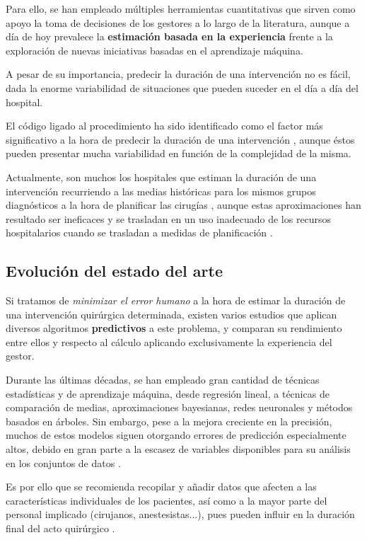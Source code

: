 Para ello, se han empleado múltiples herramientas cuantitativas que sirven como apoyo la toma de decisiones de los gestores a lo largo de la literatura, aunque a día de hoy prevalece la \textbf{estimación basada en la experiencia} \cite{Brailsford2011ORPerspective} frente a la exploración de nuevas iniciativas basadas en el aprendizaje máquina. 

A pesar de su importancia, predecir la duración de una intervención no es fácil, dada la enorme variabilidad de situaciones que pueden suceder en el día a día del hospital.

El código ligado al procedimiento ha sido identificado como el factor más significativo a la hora de predecir la duración de una intervención \cite{ShahabiKargar2014PredictingSurgery} , aunque éstos pueden presentar mucha variabilidad en función de la complejidad de la misma.

Actualmente, son muchos los hospitales que estiman la duración de una intervención recurriendo a las medias históricas para los mismos grupos diagnósticos a la hora de planificar las cirugías \cite{Wright1996StatisticalTime} , aunque estas aproximaciones han resultado ser ineficaces y se trasladan en un uso inadecuado de los recursos hospitalarios cuando se trasladan a medidas de planificación \cite{ShahabiKargar2014PredictingSurgery}.

\subsection{Evolución del estado del arte}

Si tratamos de \textit{minimizar el error humano} a la hora de estimar la duración de una intervención quirúrgica determinada, existen varios estudios que aplican diversos algoritmos \textbf{predictivos} a este problema, y comparan su rendimiento entre ellos y respecto al cálculo aplicando exclusivamente la experiencia del gestor.

Durante las últimas décadas, se han empleado gran cantidad de técnicas estadísticas y de aprendizaje máquina, desde regresión lineal, a técnicas de comparación de medias, aproximaciones bayesianas, redes neuronales y métodos basados en árboles.
Sin embargo, pese a la mejora creciente en la precisión, muchos de estos modelos siguen otorgando errores de predicción especialmente altos, debido en gran parte a la escasez de variables disponibles para su análisis en los conjuntos de datos \cite{ShahabiKargar2014PredictingSurgery}.

Es por ello que se recomienda recopilar y añadir datos que afecten a las características individuales de los pacientes, así como a la mayor parte del personal implicado (cirujanos, anestesistas...), pues pueden influir en la duración final del acto quirúrgico \cite{Wright1996StatisticalTime}.

